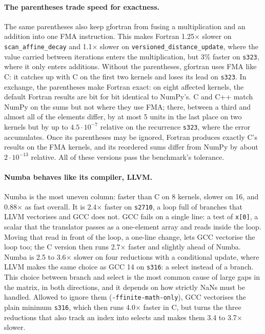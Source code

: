\paragraph{The parentheses trade speed for exactness.}
The same parentheses also keep gfortran from fusing a multiplication and an addition into one
FMA instruction. This makes Fortran 1.25$\times$ slower on \texttt{scan\_affine\_decay} and
1.1$\times$ slower on \texttt{versioned\_distance\_update}, where the value carried between
iterations enters the multiplication, but 3\% faster on \texttt{s323}, where it only enters
additions. Without the parentheses, gfortran uses FMA like C: it catches up with C on the first
two kernels and loses its lead on \texttt{s323}. In exchange, the parentheses
make Fortran exact: on eight affected kernels, the default Fortran results are bit for bit
identical to NumPy's. C and C++ match NumPy on the sums but not where they use FMA; there,
between a third and almost all of the elements differ, by at most 5 units in the last place on two kernels but by up to
$4.5\cdot10^{-7}$ relative on the recurrence \texttt{s323}, where the error accumulates. Once its
parentheses may be ignored, Fortran produces exactly C's results on the FMA kernels, and its
reordered sums differ from NumPy by about $2\cdot10^{-13}$ relative. All of these versions pass the benchmark's tolerance.

\paragraph{Numba behaves like its compiler, LLVM.}
Numba is the most uneven column: faster than C on 8 kernels, slower on 16, and 0.88$\times$ as
fast overall. It is 2.4$\times$ faster on \texttt{s2710}, a loop full of branches that LLVM
vectorises and GCC does not. GCC fails on a single line: a test of \texttt{x[0]}, a scalar that
the translator passes as a one-element array and reads inside the loop. Moving that read in
front of the loop, a one-line change, lets GCC vectorise the loop too; the C version then runs
2.7$\times$ faster and slightly ahead of Numba. Numba is 2.5 to 3.6$\times$ slower on four
reductions with a conditional update, where LLVM makes the same choice as GCC 14 on
\texttt{s316}: a select instead of a branch. This choice between branch and select is the most
common cause of large gaps in the matrix, in both directions, and it depends on how strictly NaNs
must be handled. Allowed to ignore them (\texttt{-ffinite-math-only}), GCC vectorises the plain
minimum \texttt{s316}, which then runs 4.0$\times$ faster in C, but turns the three reductions that
also track an index into selects and makes them 3.4 to 3.7$\times$ slower.


